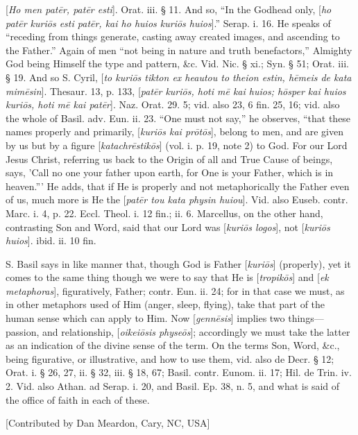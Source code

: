 [\emph{Ho men pat\={e}r, pat\={e}r esti}].
Orat. iii. § 11. And so, ``In the Godhead only, [\emph{ho pat\={e}r
kuri\={o}s esti pat\={e}r, kai ho huios kuri\={o}s huios}].''
Serap. i. 16. He speaks of ``receding from things generate, casting
away created images, and ascending to the Father.'' Again of men ``not
being in nature and truth benefactors,'' Almighty God being Himself the
type and pattern, \&c. Vid. Nic. § xi.; Syn. § 51; Orat. iii. §
19. And so S. Cyril, [\emph{to kuri\={o}s tikton ex heautou to theion
estin, h\={e}meis de kata mim\={e}sin}]. Thesaur. 13, p. 133,
[\emph{pat\={e}r kuri\={o}s, hoti m\={e} kai huios; h\={o}sper
kai huios kuri\={o}s, hoti m\={e} kai pat\={e}r}]. Naz.
Orat. 29. 5; vid. also 23, 6 fin. 25, 16; vid. also the whole of
Basil. adv. Eun. ii. 23. ``One must not say,'' he observes, ``that these
names properly and primarily, [\emph{kuri\={o}s kai pr\={o}t\={o}s}],
belong to men, and are given by us but by a figure [\emph{katachr\={e}stik\={o}s}]
(vol. i. p. 19, note 2) to God. For our Lord Jesus Christ, referring
us back to the Origin of all and True Cause of beings, says, 'Call no
one your father upon earth, for One is your Father, which is in
heaven.''' He adds, that if He is properly and not metaphorically the
Father even of us, much more is He the [\emph{pat\={e}r tou kata
physin huiou}]. Vid. also Euseb. contr. Marc. i. 4, p. 22. Eccl.
Theol. i. 12 fin.; ii. 6. Marcellus, on the other hand,
contrasting Son and Word, said that our Lord was [\emph{kuri\={o}s
logos}], not [\emph{kuri\={o}s huios}]. ibid. ii. 10 fin.

S. Basil says in like manner that, though God is
Father [\emph{kuri\={o}s}] (properly), yet it comes to the same
thing though we were to say that He is [\emph{tropik\={o}s}] and [\emph{ek
metaphoras}], figuratively, Father; contr. Eun. ii. 24; for in that
case we must, as in other metaphors used of Him (anger, sleep,
flying), take that part of the human sense which can apply to Him. Now
[\emph{genn\={e}sis}] implies two things—passion, and
relationship, [\emph{oikei\={o}sis physe\={o}s}]; accordingly we
must take the latter as an indication of the divine sense of the term.
On the terms Son, Word, \&c., being figurative, or illustrative,
and how to use them, vid. also de Decr. § 12; Orat. i. § 26, 27, ii.
§ 32, iii. § 18, 67; Basil. contr. Eunom. ii. 17; Hil. de Trin. iv.
2. Vid. also Athan. ad Serap. i. 20, and Basil. Ep. 38, n. 5, and what
is said of the office of faith in each of these.

[Contributed by Dan Meardon, Cary, NC, USA]

